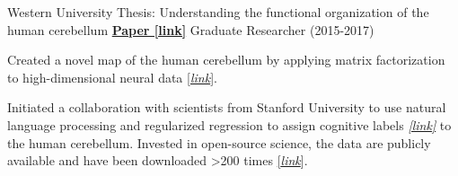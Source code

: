 \begin{cventries}
  \cventry
    {Western University} %
    {Thesis: Understanding the functional organization of the human cerebellum}
    {\href{http://ivrylab.berkeley.edu/uploads/4/1/1/5/41152143/functional_boundaries_in_the_human_cerebellum.pdf}{\textbf{Paper [link]}}}
    {Graduate Researcher (2015-2017)} %
    {
      \begin{cvitems} %
      	\item {Created a novel map of the human cerebellum by applying matrix factorization to high-dimensional neural data {\href{http://www.diedrichsenlab.org/imaging/mdtb.htm}{[\textit{link}}]}.}
      	\item {Initiated a collaboration with scientists from Stanford University to use natural language processing and regularized regression to assign cognitive labels {\href{https://cognitiveatlas.org/}{\textit{[link]}}} to the human cerebellum. Invested in open-source science, the data are publicly available and have been downloaded >200 times {\href{https://openneuro.org/datasets/ds002105/versions/1.1.0}{[\textit{link}}]}.}
      \end{cvitems}
    }
\end{cventries}
